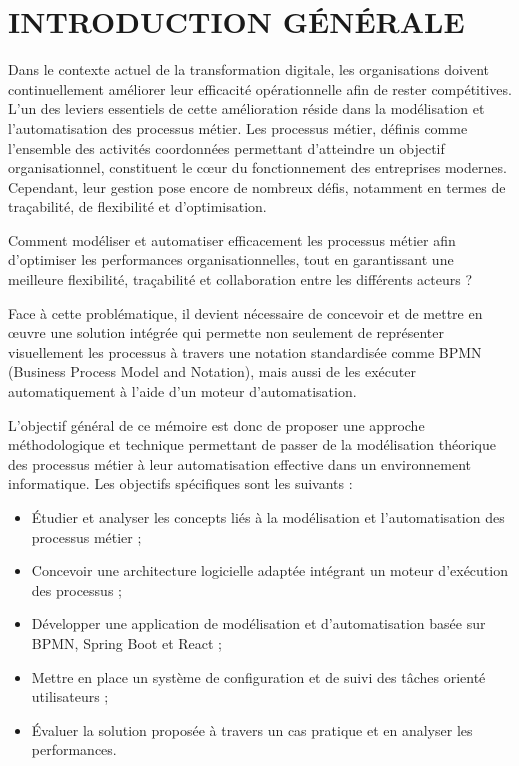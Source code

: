 
\chapter*{INTRODUCTION GÉNÉRALE}
\label{ch:introduction_generale}


Dans le contexte actuel de la transformation digitale, les organisations doivent continuellement améliorer leur efficacité opérationnelle afin de rester compétitives. L’un des leviers essentiels de cette amélioration réside dans la modélisation et l’automatisation des processus métier. Les processus métier, définis comme l’ensemble des activités coordonnées permettant d’atteindre un objectif organisationnel, constituent le cœur du fonctionnement des entreprises modernes. Cependant, leur gestion pose encore de nombreux défis, notamment en termes de traçabilité, de flexibilité et d’optimisation.

Comment modéliser et automatiser efficacement les processus métier afin d’optimiser les performances organisationnelles, tout en garantissant une meilleure flexibilité, traçabilité et collaboration entre les différents acteurs ?  

Face à cette problématique, il devient nécessaire de concevoir et de mettre en œuvre une solution intégrée qui permette non seulement de représenter visuellement les processus à travers une notation standardisée comme BPMN (Business Process Model and Notation), mais aussi de les exécuter automatiquement à l’aide d’un moteur d’automatisation.  

L’objectif général de ce mémoire est donc de proposer une approche méthodologique et technique permettant de passer de la modélisation théorique des processus métier à leur automatisation effective dans un environnement informatique. Les objectifs spécifiques sont les suivants :
\begin{itemize}
    \item Étudier et analyser les concepts liés à la modélisation et l’automatisation des processus métier ;
    \item Concevoir une architecture logicielle adaptée intégrant un moteur d’exécution des processus ;
    \item Développer une application de modélisation et d’automatisation basée sur BPMN, Spring Boot et React ;
    \item Mettre en place un système de configuration et de suivi des tâches orienté utilisateurs ;
    \item Évaluer la solution proposée à travers un cas pratique et en analyser les performances.
\end{itemize}

